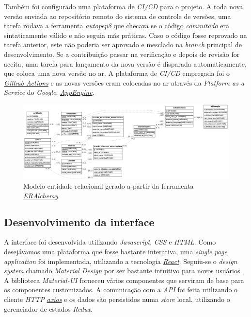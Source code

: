 Também foi configurado uma plataforma de \emph{CI/CD} para o projeto. A toda nova versão enviada 
ao repositório remoto do sistema de controle de versões, uma tarefa rodava a ferramenta \emph{autopep8}
que checava se o código \emph{commitado} era sintaticamente válido e não seguia más práticas. 
Caso o código fosse reprovado na tarefa anterior, este não poderia ser aprovado e mesclado 
na \emph{branch} principal de desenvolvimento. Se a contribuição passar na verificação e 
depois de revisão for aceita, uma tarefa para lançamento da nova versão é disparada automaticamente, 
       que coloca uma nova versão no ar. A plataforma de \emph{CI/CD} empregada foi o 
       \hyperref[link:actions]{\emph{Github Actions}} e 
       as novas versões eram colocadas no ar através da \emph{Platform as a Service} do \emph{Google}, 
       \hyperref[link:appengine]{\emph{AppEngine}}.

\begin{figure}
    \centering
    \includegraphics[width=\linewidth]{images/db_schema}
    \caption{Modelo entidade relacional gerado a partir da ferramenta \hyperref[link:eralchemy]{\emph{ERAlchemy}}.}\label{fig:mer}
\end{figure}


\subsection{Desenvolvimento da interface}
A interface foi desenvolvida utilizando \emph{Javascript}, \emph{CSS} e \emph{HTML}. Como 
desejávamos uma plataforma que fosse bastante interativa, uma \emph{single page application} 
foi implementada, utilizando a tecnologia \hyperref[link:react]{\emph{React}}.
Seguiu-se o \emph{design system} chamado 
\emph{Material Design} por ser bastante intuitivo para novos usuários. A biblioteca \emph{Material-UI} 
forneceu vários componentes que serviram de base para os componentes customizados. A comunicação com a 
\emph{API} foi feita utilizando o cliente \emph{HTTP} \hyperref[link:axios]{\emph{axios}} e 
os dados são persistidos numa \emph{store} local, utilizando o gerenciador de estados \emph{Redux}.


